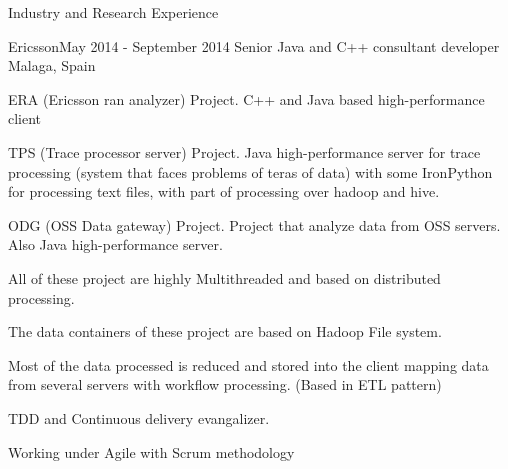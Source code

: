 \documentclass{resume} %
\begin{document}
\begin{rSection}{Industry and Research Experience}

\begin{rSubsection}{Ericsson}{May 2014 - September 2014 }{ Senior Java and C++ consultant developer }{Malaga, Spain}
\item ERA (Ericsson ran analyzer) Project. C++ and Java based high-performance client
\item TPS (Trace processor server) Project. Java high-performance server for trace processing (system that faces problems of teras of data) with some IronPython for processing text files, with part of processing over hadoop and hive.
\item ODG (OSS Data gateway) Project. Project that analyze data from OSS servers. Also Java high-performance server. 
\item All of these project are highly Multithreaded and based on distributed processing. 
\item The data containers of these project are based on Hadoop File system. 
\item Most of the data processed is reduced and stored into the client mapping data from several servers with workflow processing. (Based in ETL pattern)
\item TDD and Continuous delivery evangalizer.
\item Working under Agile with Scrum methodology
\end{rSubsection}




\end{rSection}
\end{document}
